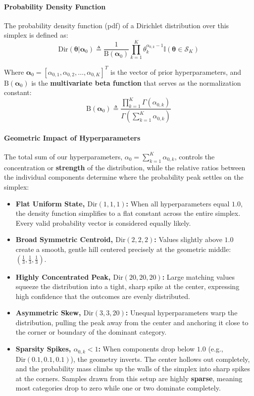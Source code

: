 \documentclass{article}
\begin{document}
\paragraph{Probability Density Function}
The probability density function (pdf) of a Dirichlet distribution over this simplex is defined as:
\begin{equation}
\text{Dir}(\boldsymbol{\theta}|\boldsymbol{\alpha}_0) \triangleq \frac{1}{\text{B}(\boldsymbol{\alpha}_0)} \prod_{k=1}^K \theta_k^{\alpha_{0,k} - 1} \mathbb{I}(\boldsymbol{\theta} \in \mathcal{S}_K)
\end{equation}

Where $\boldsymbol{\alpha}_0 = [\alpha_{0,1}, \alpha_{0,2}, \dots, \alpha_{0,K}]^T$ is the vector of prior hyperparameters, and $\text{B}(\boldsymbol{\alpha}_0)$ is the \textbf{multivariate beta function} that serves as the normalization constant:
\begin{equation}
\text{B}(\boldsymbol{\alpha}_0) \triangleq \frac{\prod_{k=1}^K \Gamma(\alpha_{0,k})}{\Gamma\left(\sum_{k=1}^K \alpha_{0,k}\right)}
\end{equation}

\paragraph{Geometric Impact of Hyperparameters}
The total sum of our hyperparameters, $\alpha_{0} = \sum_{k=1}^K \alpha_{0,k}$, controls the concentration or \textbf{strength} of the distribution, while the relative ratios between the individual components determine where the probability peak settles on the simplex:
\begin{itemize}
    \item \textbf{Flat Uniform State, $\text{Dir}(1, 1, 1)$:} When all hyperparameters equal $1.0$, the density function simplifies to a flat constant across the entire simplex. Every valid probability vector is considered equally likely.
    \item \textbf{Broad Symmetric Centroid, $\text{Dir}(2, 2, 2)$:} Values slightly above $1.0$ create a smooth, gentle hill centered precisely at the geometric middle: $(\frac{1}{3}, \frac{1}{3}, \frac{1}{3})$.
    \item \textbf{Highly Concentrated Peak, $\text{Dir}(20, 20, 20)$:} Large matching values squeeze the distribution into a tight, sharp spike at the center, expressing high confidence that the outcomes are evenly distributed.
    \item \textbf{Asymmetric Skew, $\text{Dir}(3, 3, 20)$:} Unequal hyperparameters warp the distribution, pulling the peak away from the center and anchoring it close to the corner or boundary of the dominant category.
    \item \textbf{Sparsity Spikes, $\alpha_{0,k} < 1$:} When components drop below $1.0$ (e.g., $\text{Dir}(0.1, 0.1, 0.1)$), the geometry inverts. The center hollows out completely, and the probability mass climbs up the walls of the simplex into sharp spikes at the corners. Samples drawn from this setup are highly \textbf{sparse}, meaning most categories drop to zero while one or two dominate completely.
\end{itemize}
\end{document}
